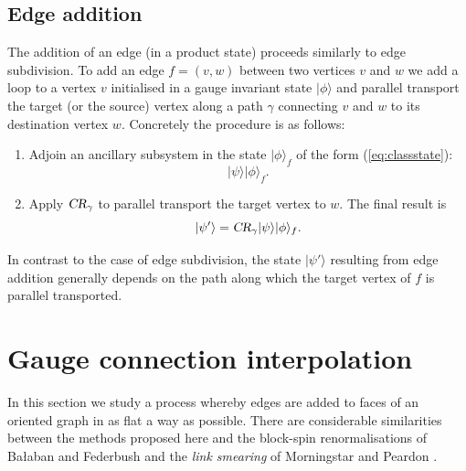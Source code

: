 \documentclass[12pt]{amsart}
\def\CR{\textsl{CR}}
\theoremstyle{definition}
\theoremstyle{remark}
\numberwithin{equation}{section}
\begin{document}
\subsection{Edge addition}
The addition of an edge (in a product state) proceeds similarly to edge subdivision. To add an edge $f = (v,w)$ between two vertices $v$ and $w$ we add a loop to a vertex $v$ initialised in a gauge invariant state $|\phi\rangle$ and parallel transport the target (or the source) vertex along a path $\gamma$ connecting $v$ and $w$ to its destination vertex $w$.  Concretely the procedure is as follows:
\begin{enumerate}
	\item Adjoin an ancillary subsystem in the state $|\phi\rangle_{f}$ of the form (\ref{eq:classstate}):
	\begin{equation}
		|\psi\rangle |\phi\rangle_{f}.
	\end{equation} 
	\item Apply $\CR_\gamma$ to parallel transport the target vertex to $w$. The final result is
	\begin{equation}
		|\psi'\rangle = \CR_{\gamma}|\psi\rangle |\phi\rangle_{f}.
	\end{equation}
\end{enumerate}

In contrast to the case of edge subdivision, the state $|\psi'\rangle$ resulting from edge addition generally depends on the path along which the target vertex of $f$ is parallel transported.

\section{Gauge connection interpolation}
In this section we study a process whereby edges are added to faces of an oriented graph in as flat a way as possible. There are considerable similarities between the methods proposed here and the block-spin renormalisations of Ba{\l}aban and Federbush and the \emph{link smearing} of Morningstar and Peardon \cite{Morningstar:2004a}.
\end{document}
